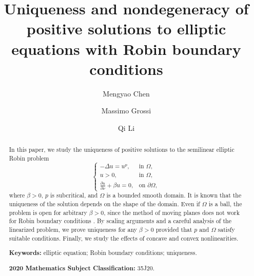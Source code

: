 \documentclass[12pt,reqno]{amsart}
\numberwithin{equation}{section}
\theoremstyle{definition}
\begin{document}
\title[Some semilinear elliptic equations with Robin boundary condition]{
Uniqueness and nondegeneracy of positive solutions to  elliptic equations with Robin boundary conditions}

\author{Mengyao Chen}
\address{Mengyao Chen, School of Mathematics and Systems Science \& Hubei Province Key Laboratory of Systems Science in Metallurgical Process, Wuhan University of Science and Technology, Wuhan 430065, P. R. China.}

\author{Massimo Grossi}
\address{Massimo Grossi, Dipartimento di Matematica, Universit\`a di Roma ``La Sapienza'', P.le A. Moro 2, 00185 Roma, Italy}

\author{Qi Li}
\address{Qi Li, School of Mathematics and Systems Science \& Hubei Province Key Laboratory of Systems Science in Metallurgical Process, Wuhan University of Science and Technology, Wuhan 430065, P. R. China.}

\begin{abstract}
In this paper, we study the uniqueness of positive solutions to the semilinear elliptic Robin problem
\begin{equation*}
\begin{cases}
-\Delta u = u^p, & \text{in } \Omega,\\
u > 0, & \text{in } \Omega,\\
\frac{\partial u}{\partial \nu} + \beta u = 0, & \text{on } \partial \Omega,
\end{cases}
\end{equation*}
where $\beta > 0$, $p$ is subcritical, and $\Omega$ is a bounded smooth domain. 
It is known that the uniqueness of the solution depends on the shape of the domain. Even if $\Omega$ is a ball, the problem is open for arbitrary $\beta>0$, since the method of moving planes does not work for Robin boundary conditions . By scaling arguments and a careful analysis of the linearized problem, we prove uniqueness for any $\beta>0$ provided that $p$ and $\Omega$ satisfy suitable conditions. Finally,  we study the effects of concave and convex nonlinearities.
\medskip

\noindent\textbf{Keywords:} elliptic equation; Robin boundary conditions; uniqueness.

\medskip

\noindent\textbf{2020 Mathematics Subject Classification:} 35J20.

\end{abstract}
\end{document}
